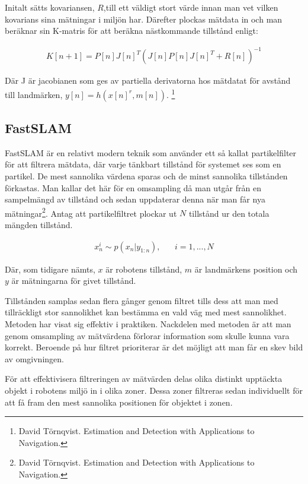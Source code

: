 \documentclass[a4paper,12pt,fleqn]{article}
\begin{document}
Initalt sätts kovariansen, $R$,till ett väldigt stort värde innan man vet vilken kovarians sina mätningar i miljön har. Därefter plockas mätdata in och man beräknar sin K-matris för att beräkna nästkommande tillstånd enligt: 

\begin{gather}
K[n+1] =  P[n]J[n]^{T}(J[n]P[n]J[n]^{T}+R[n])^{-1}
\end{gather}

Där J är jacobianen\label{equ:jacobian} som ges av partiella derivatorna hos mätdatat för avstånd till landmärken, $y[n] = h(x[n]^{r},m[n])$. \footnote{David Törnqvist. Estimation and Detection with Applications to Navigation.}

\newpage

\subsection{FastSLAM}
FastSLAM är en relativt modern teknik som använder ett så kallat partikelfilter för att filtrera mätdata, där varje tänkbart tillstånd för systemet ses som en partikel. De mest sannolika värdena sparas och de minst sannolika tillstånden förkastas. Man kallar det här för en omsampling då man utgår från en sampelmängd av tillstånd och sedan uppdaterar denna när man får nya mätningar\footnote{David Törnqvist. Estimation and Detection with Applications to Navigation.}. Antag att partikelfiltret plockar ut $N$ tillstånd ur den totala mängden tillstånd. 

\begin{gather}
x^i_n \sim p(x_n|y_{1:n}),\;\;\;\;\;\; i = 1, ..., N
\end{gather}

Där, som tidigare nämts, $x$ är robotens tillstånd, $m$ är landmärkens position och $y$ är mätningarna för givet tillstånd.  

Tillstånden samplas sedan flera gånger genom filtret tills dess att man med tillräckligt stor sannolikhet kan bestämma en vald väg med mest sannolikhet. Metoden har visat sig effektiv i praktiken. Nackdelen med metoden är att man genom omsampling av mätvärdena förlorar information som skulle kunna vara korrekt. Beroende på hur filtret prioriterar är det möjligt att man får en skev bild av omgivningen. 

För att effektivisera filtreringen av mätvärden delas olika distinkt upptäckta objekt i robotens miljö in i olika zoner. Dessa zoner filtreras sedan individuellt för att få fram den mest sannolika positionen för objektet i zonen.
\end{document}
